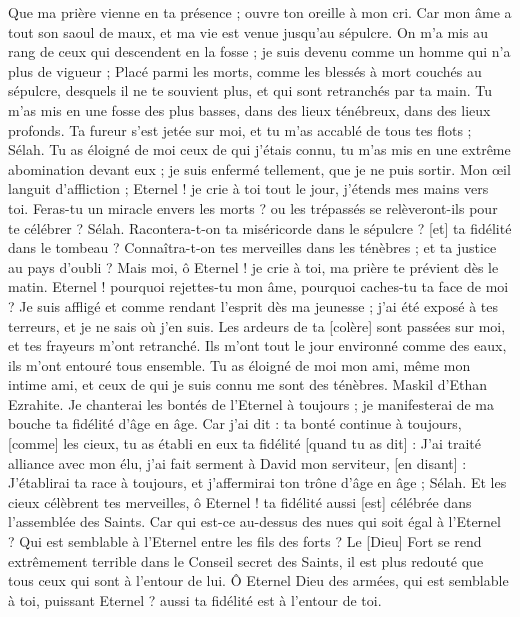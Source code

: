 \begin{multicols}{2}
Que ma prière vienne en ta présence ; ouvre ton oreille à mon cri.
Car mon âme a tout son saoul de maux, et ma vie est venue jusqu'au sépulcre.
On m'a mis au rang de ceux qui descendent en la fosse ; je suis devenu comme un homme qui n'a plus de vigueur ;
Placé parmi les morts, comme les blessés à mort couchés au sépulcre, desquels il ne te souvient plus, et qui sont retranchés par ta main.
Tu m'as mis en une fosse des plus basses, dans des lieux ténébreux, dans des lieux profonds.
Ta fureur s'est jetée sur moi, et tu m'as accablé de tous tes flots ; Sélah.
Tu as éloigné de moi ceux de qui j'étais connu, tu m'as mis en une extrême abomination devant eux ; je suis enfermé tellement, que je ne puis sortir.
Mon œil languit d'affliction ; Eternel ! je crie à toi tout le jour, j'étends mes mains vers toi.
Feras-tu un miracle envers les morts ? ou les trépassés se relèveront-ils pour te célébrer ? Sélah.
Racontera-t-on ta miséricorde dans le sépulcre ? [et] ta fidélité dans le tombeau ?
Connaîtra-t-on tes merveilles dans les ténèbres ; et ta justice au pays d'oubli ?
Mais moi, ô Eternel ! je crie à toi, ma prière te prévient dès le matin.
Eternel ! pourquoi rejettes-tu mon âme, pourquoi caches-tu ta face de moi ?
Je suis affligé et comme rendant l'esprit dès ma jeunesse ; j'ai été exposé à tes terreurs, et je ne sais où j'en suis.
Les ardeurs de ta [colère] sont passées sur moi, et tes frayeurs m'ont retranché.
Ils m'ont tout le jour environné comme des eaux, ils m'ont entouré tous ensemble.
Tu as éloigné de moi mon ami, même mon intime ami, et ceux de qui je suis connu me sont des ténèbres.
\VerseOne{}Maskil d'Ethan Ezrahite. Je chanterai les bontés de l'Eternel à toujours ; je manifesterai de ma bouche ta fidélité d'âge en âge.
Car j'ai dit : ta bonté continue à toujours, [comme] les cieux, tu as établi en eux ta fidélité [quand tu as dit] :
J'ai traité alliance avec mon élu, j'ai fait serment à David mon serviteur, [en disant] :
J'établirai ta race à toujours, et j'affermirai ton trône d'âge en âge ; Sélah.
Et les cieux célèbrent tes merveilles, ô Eternel ! ta fidélité aussi [est] célébrée dans l'assemblée des Saints.
Car qui est-ce au-dessus des nues qui soit égal à l'Eternel ? Qui est semblable à l'Eternel entre les fils des forts ?
Le [Dieu] Fort se rend extrêmement terrible dans le Conseil secret des Saints, il est plus redouté que tous ceux qui sont à l'entour de lui.
Ô Eternel Dieu des armées, qui est semblable à toi, puissant Eternel ? aussi ta fidélité est à l'entour de toi.

\end{multicols}
